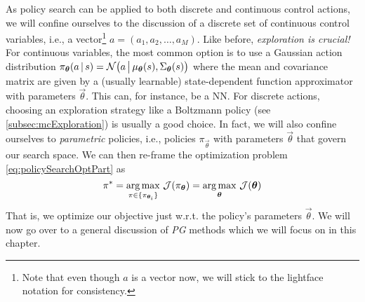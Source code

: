 	As policy search can be applied to both discrete and continuous control actions, we will confine ourselves to the discussion of a discrete set of continuous control variables, i.e., a vector\footnote{Note that even though \(a\) is a vector now, we will stick to the lightface notation for consistency.} \( a = (a_1, a_2, \dots, a_M) \). Like before, \emph{exploration is crucial!} For continuous variables, the most common option is to use a Gaussian action distribution \( \pi_{\bm{\theta}}(a \,\vert\, s) = \mathcal{N}\bigl( a \,\big\vert\, \mu_{\bm{\theta}}(s), \Sigma_{\bm{\theta}}(s) \bigr) \) where the mean and covariance matrix are given by a (usually learnable) state-dependent function approximator with parameters \(\vec{\theta}\). This can, for instance, be a \ac{NN}. For discrete actions, choosing an exploration strategy like a Boltzmann policy (see \autoref{subsec:mcExploration}) is usually a good choice. In fact, we will also confine ourselves to \emph{parametric} policies, i.e., policies \(\pi_{\vec{\theta}}\) with parameters \(\vec{\theta}\) that govern our search space. We can then re-frame the optimization problem \eqref{eq:policySearchOptPart} as
	\begin{equation}
		\pi^\ast
		= \operatorname*{arg\,max}_{\pi \in \{ \pi_{\bm{\theta}_i} \}} \, \mathcal{J}(\pi_{\bm{\theta}})
		= \operatorname*{arg\,max}_{\bm{\theta}} \, \mathcal{J}(\bm{\theta})
	\end{equation}
	That is, we optimize our objective just w.r.t. the policy's parameters \(\vec{\theta}\). We will now go over to a general discussion of \emph{\acl{PG}} methods which we will focus on in this chapter.

